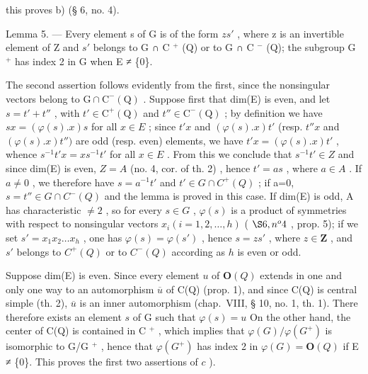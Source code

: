 this proves b) (§ 6, no. 4).

Lemma 5. --- Every element s of G is of the form \(zs'\) , where z is an invertible element of Z and \(s'\) belongs to G ∩ C \(^{+}\) (Q) or to G ∩ C \(^{-}\) (Q); the subgroup G \(^{+}\) has index 2 in G when E ≠ \{0\}.

The second assertion follows evidently from the first, since the nonsingular vectors belong to \(\mathrm{G}\cap\mathrm{C}^{-}(\mathrm{Q})\) . Suppose first that dim(E) is even, and let \(s=t'+t''\) , with \(t'\in\mathrm{C}^{+}(\mathrm{Q})\) and \(t''\in\mathrm{C}^{-}(\mathrm{Q})\) ; by definition we have \(sx=(\varphi(s).x)s\) for all \(x\in E\) ; since \(t'x\) and \((\varphi(s).x)t'\) (resp. \(t''x\) and \((\varphi(s).x)t'')\) are odd (resp. even) elements, we have \(t'x=(\varphi(s).x)t'\) , whence \(s^{-1}t'x=xs^{-1}t'\) for all \(x\in E\) . From this we conclude that \(s^{-1}t'\in Z\) and since dim(E) is even, \(Z=A\) (no. 4, cor. of th. 2) , hence \(t'=as\) , where \(a\in A\) . If \(a\neq0\) , we therefore have \(s=a^{-1}t'\) and \(t'\in G\cap C^{+}(Q)\) ; if a=0, \(s=t''\in G\cap C^{-}(Q)\) and the lemma is proved in this case. If dim(E) is odd, A has characteristic \(\neq2\) , so for every \(s\in G\) , \(\varphi(s)\) is a product of symmetries with respect to nonsingular vectors \(x_{i} (i = 1,2,\ldots,h)\) ( \(\S 6, n^{o} 4\) , prop. 5); if we set \(s' = x_{1}x_{2}\ldots x_{h}\) , one has \(\varphi(s) = \varphi(s')\) , hence \(s = zs'\) , where \(z \in \mathbf{Z}\) , and \(s'\) belongs to \(C^{+}(Q)\) or to \(C^{-}(Q)\) according as \(h\) is even or odd.

Suppose dim(E) is even. Since every element \(u\) of \(\mathbf{O}(Q)\) extends in one and only one way to an automorphism \(\overline{u}\) of C(Q) (prop. 1), and since C(Q) is central simple (th. 2), \(\overline{u}\) is an inner automorphism (chap.~VIII, § 10, no. 1, th. 1). There therefore exists an element \(s\) of G such that \(\varphi(s) = u\) On the other hand, the center of C(Q) is contained in C \(^{+}\) , which implies that \(\varphi(G)/\varphi(G^{+})\) is isomorphic to G/G \(^{+}\) , hence that \(\varphi(G^{+})\) has index 2 in \(\varphi(G) = \mathbf{O}(Q)\) if E ≠ \{0\}. This proves the first two assertions of \(c\) ).

